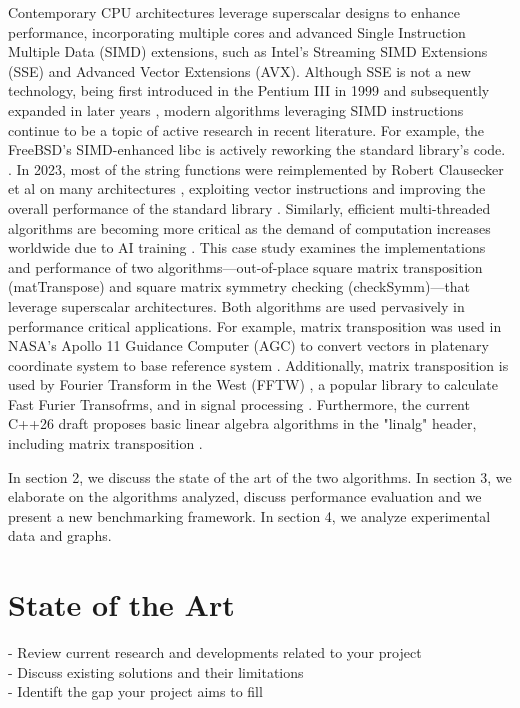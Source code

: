 \documentclass[conference]{IEEEtran}
\begin{document}
Contemporary CPU architectures leverage superscalar designs to enhance performance, incorporating multiple cores and advanced Single Instruction Multiple Data (SIMD) extensions, such as Intel's Streaming SIMD Extensions (SSE) and Advanced Vector Extensions (AVX). Although SSE is not a new technology, being first introduced in the Pentium III in 1999 and subsequently expanded in later years \cite{b1}, modern algorithms leveraging SIMD instructions continue to be a topic of active research in recent literature.
For example, the FreeBSD's SIMD-enhanced libc is actively reworking the standard library's code. \cite{b2}.
In 2023, most of the string functions were reimplemented by Robert Clausecker et al on many architectures \cite{b3}, exploiting vector instructions and improving the overall performance of the standard library \cite{b4}.
Similarly, efficient multi-threaded algorithms are becoming more critical as the demand of computation increases worldwide due to AI training \cite{b5} \cite{b6}.
This case study examines the implementations and performance of two algorithms—out-of-place square matrix transposition (matTranspose) and square matrix symmetry checking (checkSymm)—that leverage superscalar architectures. Both algorithms are used pervasively in performance critical applications. For example, matrix transposition was used in NASA's Apollo 11 Guidance Computer (AGC) to convert vectors in platenary coordinate system to base reference system \cite{b7}. Additionally, matrix transposition is used by Fourier Transform in the West (FFTW) \cite{b8}, a popular library to calculate Fast Furier Transofrms, and in signal processing \cite{b9}. Furthermore, the current C++26 draft proposes basic linear algebra algorithms in the "linalg" header, including matrix transposition \cite{b10}.

In section 2, we discuss the state of the art of the two algorithms.
In section 3, we elaborate on the algorithms analyzed, discuss performance evaluation and we present a new benchmarking framework.
In section 4, we analyze experimental data and graphs.


\section{State of the Art}

- Review current research and developments related to your project \\
- Discuss existing solutions and their limitations \\
- Identift the gap your project aims to fill \\
\end{document}
